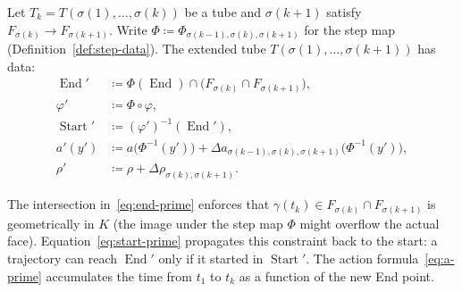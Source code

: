 \begin{definition}\label{def:tube-extension}
Let $T_k = T(\sigma(1), \ldots, \sigma(k))$ be a tube
and $\sigma(k+1)$ satisfy $F_{\sigma(k)} \to F_{\sigma(k+1)}$.
Write $\Phi \coloneqq \Phi_{\sigma(k-1),\sigma(k),\sigma(k+1)}$
for the step map (Definition~\ref{def:step-data}).
The extended tube $T(\sigma(1), \ldots, \sigma(k+1))$ has data:
\begin{align}
  \operatorname{End}' &\coloneqq
    \Phi(\operatorname{End}) \cap \bigl( F_{\sigma(k)} \cap F_{\sigma(k+1)} \bigr),
    \label{eq:end-prime}\\
  \varphi' &\coloneqq \Phi \circ \varphi,
    \label{eq:phi-prime}\\
  \operatorname{Start}' &\coloneqq (\varphi')^{-1}(\operatorname{End}'),
    \label{eq:start-prime}\\
  a'(y') &\coloneqq
    a\bigl(\Phi^{-1}(y')\bigr)
    + \Delta a_{\sigma(k-1),\sigma(k),\sigma(k+1)}\bigl(\Phi^{-1}(y')\bigr),
    \label{eq:a-prime}\\
  \rho' &\coloneqq \rho + \Delta\rho_{\sigma(k),\sigma(k+1)}.
    \label{eq:rho-prime}
\end{align}
\end{definition}

\begin{remark}[Interpretation]\label{rem:extension-interpretation}
The intersection in~\eqref{eq:end-prime} enforces that
$\gamma(t_k) \in F_{\sigma(k)} \cap F_{\sigma(k+1)}$
is geometrically in $K$ (the image under the step map
$\Phi$ might overflow the actual face).
Equation~\eqref{eq:start-prime} propagates this constraint back to the start:
a trajectory can reach $\operatorname{End}'$ only if it started in $\operatorname{Start}'$.
The action formula~\eqref{eq:a-prime} accumulates the time
from $t_1$ to $t_k$ as a function of the new End point.
\end{remark}

